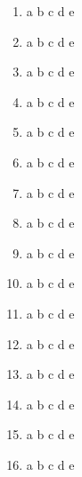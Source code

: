 \documentclass[8pt]{article}
\begin{document}
\begin{multicols*}{2}
\begin{enumerate}
\item \large \textcircled{\small{a}} \textcircled{\small{b}} \textcircled{\small{c}} \textcircled{\small{d}} \textcircled{\small{e}}
\item \large \textcircled{\small{a}} \textcircled{\small{b}} \textcircled{\small{c}} \textcircled{\small{d}} \textcircled{\small{e}}
\item \large \textcircled{\small{a}} \textcircled{\small{b}} \textcircled{\small{c}} \textcircled{\small{d}} \textcircled{\small{e}}
\item \large \textcircled{\small{a}} \textcircled{\small{b}} \textcircled{\small{c}} \textcircled{\small{d}} \textcircled{\small{e}}
\item \large \textcircled{\small{a}} \textcircled{\small{b}} \textcircled{\small{c}} \textcircled{\small{d}} \textcircled{\small{e}}
\item \large \textcircled{\small{a}} \textcircled{\small{b}} \textcircled{\small{c}} \textcircled{\small{d}} \textcircled{\small{e}}
\item \large \textcircled{\small{a}} \textcircled{\small{b}} \textcircled{\small{c}} \textcircled{\small{d}} \textcircled{\small{e}}
\item \large \textcircled{\small{a}} \textcircled{\small{b}} \textcircled{\small{c}} \textcircled{\small{d}} \textcircled{\small{e}}
\item \large \textcircled{\small{a}} \textcircled{\small{b}} \textcircled{\small{c}} \textcircled{\small{d}} \textcircled{\small{e}}
\item \large \textcircled{\small{a}} \textcircled{\small{b}} \textcircled{\small{c}} \textcircled{\small{d}} \textcircled{\small{e}}
\item \large \textcircled{\small{a}} \textcircled{\small{b}} \textcircled{\small{c}} \textcircled{\small{d}} \textcircled{\small{e}}
\item \large \textcircled{\small{a}} \textcircled{\small{b}} \textcircled{\small{c}} \textcircled{\small{d}} \textcircled{\small{e}}
\item \large \textcircled{\small{a}} \textcircled{\small{b}} \textcircled{\small{c}} \textcircled{\small{d}} \textcircled{\small{e}}
\item \large \textcircled{\small{a}} \textcircled{\small{b}} \textcircled{\small{c}} \textcircled{\small{d}} \textcircled{\small{e}}
\item \large \textcircled{\small{a}} \textcircled{\small{b}} \textcircled{\small{c}} \textcircled{\small{d}} \textcircled{\small{e}}
\item \large \textcircled{\small{a}} \textcircled{\small{b}} \textcircled{\small{c}} \textcircled{\small{d}} \textcircled{\small{e}}

\end{enumerate}
\end{multicols*}
\end{document}
